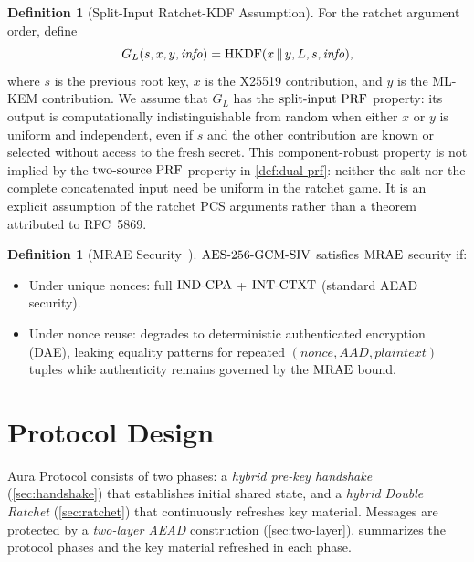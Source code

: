 \documentclass[preprint,12pt]{elsarticle}
\theoremstyle{definition}
\newtheorem{definition}[theorem]{Definition}
\newcommand{\tech}[1]{\textnormal{#1}}
\newcommand{\HKDF}{\tech{HKDF}}
\newcommand{\AEAD}{\tech{AES-256-GCM-SIV}}
\newcommand{\INDCPA}{\tech{IND-CPA}}
\newcommand{\INTCTXT}{\tech{INT-CTXT}}
\newcommand{\MRAE}{\tech{MRAE}}
\newcommand{\twoSourcePRF}{\tech{two-source PRF}}
\newcommand{\splitInputPRF}{\tech{split-input PRF}}
\newcommand{\concat}{\,\|\,}
\begin{document}
\begin{definition}[Split-Input Ratchet-KDF Assumption]\label{def:split-prf}
For the ratchet argument order, define
\[
  G_L(s,x,y,\mathit{info}) =
  \HKDF(x\concat y,L,s,\mathit{info}),
\]
where $s$ is the previous root key, $x$ is the X25519 contribution, and $y$
is the ML-KEM contribution. We assume that $G_L$ has the
$\splitInputPRF$ property: its output is computationally indistinguishable
from random when either $x$ or $y$ is uniform and independent, even if $s$
and the other contribution are known or selected without access to the fresh
secret. This component-robust property is not implied by the
$\twoSourcePRF$ property in \cref{def:dual-prf}: neither the salt nor the
complete concatenated input need be uniform in the ratchet game. It is an explicit assumption
of the ratchet PCS arguments rather than a theorem attributed to RFC~5869.
\end{definition}

\begin{definition}[MRAE Security~\cite{rfc8452,rogaway2006}]\label{def:mrae}
$\AEAD$ satisfies $\MRAE$ security if:
\begin{itemize}
  \item Under unique nonces: full $\INDCPA$ + $\INTCTXT$ (standard AEAD security).
  \item Under nonce reuse: degrades to deterministic authenticated encryption (DAE), leaking equality patterns for repeated $(\mathit{nonce}, \mathit{AAD}, \mathit{plaintext})$ tuples while authenticity remains governed by the $\MRAE$ bound.
\end{itemize}
\end{definition}


\section{Protocol Design}\label{sec:protocol}

Aura Protocol consists of two phases: a \emph{hybrid pre-key handshake} (\cref{sec:handshake}) that establishes initial shared state, and a \emph{hybrid Double Ratchet} (\cref{sec:ratchet}) that continuously refreshes key material. Messages are protected by a \emph{two-layer AEAD} construction (\cref{sec:two-layer}).  summarizes the protocol phases and the key material refreshed in each phase.
\end{document}
